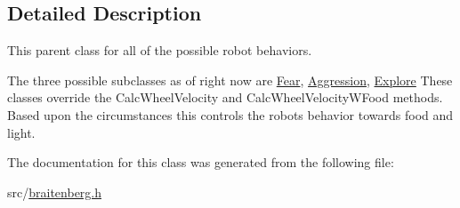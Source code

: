 \subsection{Detailed Description}
This parent class for all of the possible robot behaviors. 

The three possible subclasses as of right now are \mbox{\hyperlink{class_fear}{Fear}}, \mbox{\hyperlink{class_aggression}{Aggression}}, \mbox{\hyperlink{class_explore}{Explore}} These classes override the Calc\+Wheel\+Velocity and Calc\+Wheel\+Velocity\+W\+Food methods. Based upon the circumstances this controls the robot\textquotesingle{}s behavior towards food and light. 

The documentation for this class was generated from the following file\+:\begin{DoxyCompactItemize}
\item 
src/\mbox{\hyperlink{braitenberg_8h}{braitenberg.\+h}}\end{DoxyCompactItemize}
